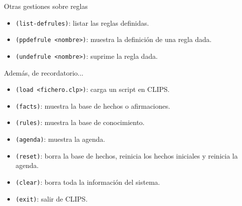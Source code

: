 \documentclass[usenames,dvipsnames,aspectratio=169]{beamer}
\begin{document}
\begin{frame}{Otras gestiones sobre reglas}
	\begin{itemize}
		\item \texttt{(list-defrules)}: listar las reglas definidas.
		\item \texttt{(ppdefrule <nombre>)}: muestra la definición de una regla dada.
		\item \texttt{(undefrule <nombre>)}: suprime la regla dada.
	\end{itemize}
	Además, de recordatorio...
	\begin{itemize}
		\item \texttt{(load <fichero.clp>)}: carga un script en CLIPS.
		\item \texttt{(facts)}: muestra la base de hechos o afirmaciones.
		\item \texttt{(rules)}: muestra la base de conocimiento.
		\item \texttt{(agenda)}: muestra la agenda.
		\item \texttt{(reset)}: borra la base de hechos, reinicia los hechos iniciales y reinicia la agenda.
		\item \texttt{(clear)}: borra toda la información del sistema.
		\item \texttt{(exit)}: salir de CLIPS.
	\end{itemize}
\end{frame}

\begin{frame}
\titlepage
\end{frame}
\end{document}
